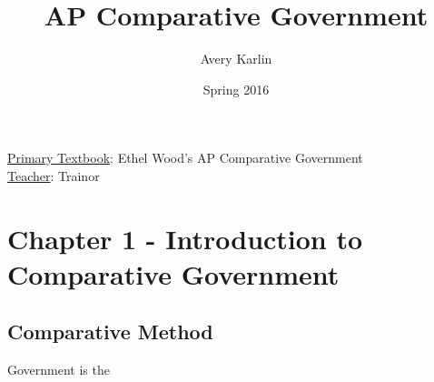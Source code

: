 \documentclass[11 pt, twoside]{article}
\newenvironment{outline*}
{
	\begin{outline}[enumerate]
	\setlength{\itemsep}{0pt}
	\setlength{\parsep}{0pt}
	}
	{\end{outline}
}
\begin{document}
\title{AP Comparative Government}
\author{Avery Karlin}
\date{Spring 2016}
\newcommand{\textbook}{Ethel Wood's AP Comparative Government}
\newcommand{\teacher}{Trainor}

\maketitle
\newpage
\tableofcontents
\vspace{11pt}
\noindent
\underline{Primary Textbook}: \textbook\\
\underline{Teacher}: \teacher
\newpage

\section{Chapter 1 - Introduction to Comparative Government}

\subsection{Comparative Method}
\begin{outline*}
\1 Government is the  
\end{outline*}
\end{document}
